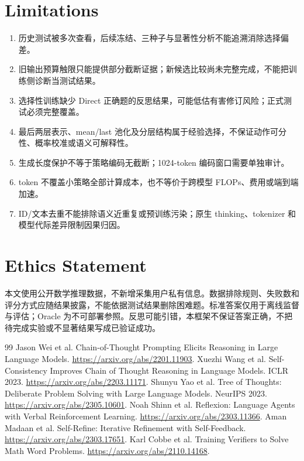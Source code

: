 \documentclass[11pt]{article}
\begin{document}
\section{Limitations}
\begin{enumerate}
\item 历史测试被多次查看，后续冻结、三种子与显著性分析不能追溯消除选择偏差。
\item 旧输出预算触限只能提供部分截断证据；新候选比较尚未完整完成，不能把训练侧诊断当测试结果。
\item 选择性训练缺少 Direct 正确题的反思结果，可能低估有害修订风险；正式测试必须完整覆盖。
\item 最后两层表示、mean/last 池化及分层结构属于经验选择，不保证动作可分性、概率校准或语义可解释性。
\item 生成长度保护不等于策略编码无截断；1024-token 编码窗口需要单独审计。
\item token 不覆盖小策略全部计算成本，也不等价于跨模型 FLOPs、费用或端到端加速。
\item ID/文本去重不能排除语义近重复或预训练污染；原生 thinking、tokenizer 和模型代际差异限制因果归因。
\end{enumerate}

\section{Ethics Statement}
本文使用公开数学推理数据，不新增采集用户私有信息。数据排除规则、失败数和评分方式应随结果披露，不能依据测试结果删除困难题。标准答案仅用于离线监督与评估；Oracle 为不可部署参照。反思可能引错，本框架不保证答案正确，不把待完成实验或不显著结果写成已验证成功。

\begin{thebibliography}{99}
 Jason Wei et al. Chain-of-Thought Prompting Elicits Reasoning in Large Language Models. \url{https://arxiv.org/abs/2201.11903}.
 Xuezhi Wang et al. Self-Consistency Improves Chain of Thought Reasoning in Language Models. ICLR 2023. \url{https://arxiv.org/abs/2203.11171}.
 Shunyu Yao et al. Tree of Thoughts: Deliberate Problem Solving with Large Language Models. NeurIPS 2023. \url{https://arxiv.org/abs/2305.10601}.
 Noah Shinn et al. Reflexion: Language Agents with Verbal Reinforcement Learning. \url{https://arxiv.org/abs/2303.11366}.
 Aman Madaan et al. Self-Refine: Iterative Refinement with Self-Feedback. \url{https://arxiv.org/abs/2303.17651}.
 Karl Cobbe et al. Training Verifiers to Solve Math Word Problems. \url{https://arxiv.org/abs/2110.14168}.
\end{thebibliography}
\end{document}
